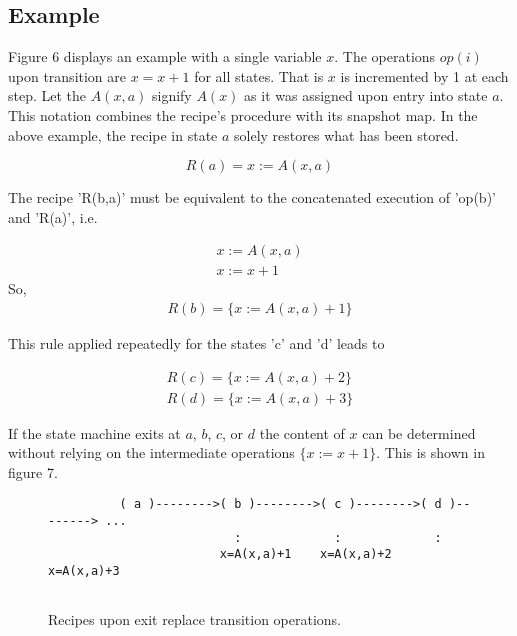 \documentclass[12pt,a4paper]{scrartcl}
\begin{document}
\subsection{Example}

Figure 6 displays an example with a single variable $x$. The operations $op(i)$
upon transition are $x=x+1$ for all states. That is $x$ is incremented by 1 at
each step. Let the $A(x,a)$ signify $A(x)$ as it was assigned upon entry into
state $a$. This notation combines the recipe's procedure with its snapshot map.
In the above example, the recipe in state $a$ solely restores what has been
stored.

\begin{equation}
\label{eq:}
               R(a) = { x := A(x,a) }                                     
\end{equation}

The recipe 'R(b,a)' must be equivalent to the concatenated execution of 'op(b)'
and 'R(a)', i.e.

\begin{eqnarray}
    { x  :=  A(x,a) } \\
    { x  :=  x + 1 }
\end{eqnarray}
So, 
\begin{eqnarray}
    R(b)  =  \{ x := A(x,a) + 1 \}                                 
\end{eqnarray}

This rule applied repeatedly for the states 'c' and 'd' leads to

\begin{eqnarray}
    R(c)  =  \{ x := A(x,a) + 2 \} \\
    R(d)  =  \{ x := A(x,a) + 3 \}                                 
\end{eqnarray}

If the state machine exits at $a$, $b$, $c$, or $d$ the content of $x$ can be
determined without relying on the intermediate operations $\{ x:=x+1 \}$. This
is shown in figure 7.
 
\begin{figure}[htbp] \leavevmode
\begin{verbatim}
          ( a )-------->( b )-------->( c )-------->( d )--------> ...
                          :             :             :
                        x=A(x,a)+1    x=A(x,a)+2    x=A(x,a)+3


\end{verbatim}
\caption{Recipes upon exit replace transition operations.}
\end{figure}
\end{document}
